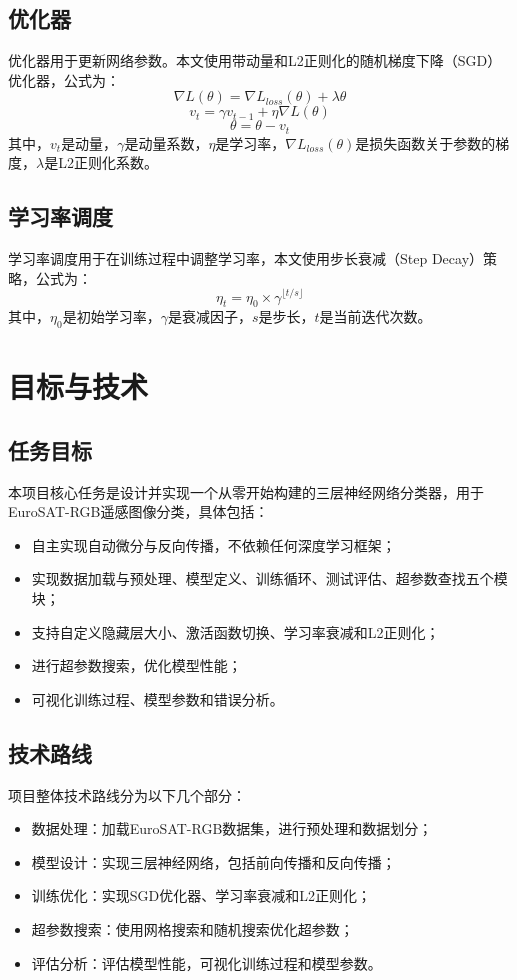 \documentclass[UTF8]{article}
\begin{document}
\subsection{优化器}

优化器用于更新网络参数。本文使用带动量和L2正则化的随机梯度下降（SGD）优化器，公式为：
$$\nabla L(\theta) = \nabla L_{loss}(\theta) + \lambda \theta$$
$$v_t = \gamma v_{t-1} + \eta \nabla L(\theta)$$
$$\theta = \theta - v_t$$
其中，$v_t$是动量，$\gamma$是动量系数，$\eta$是学习率，$\nabla L_{loss}(\theta)$是损失函数关于参数的梯度，$\lambda$是L2正则化系数。

\subsection{学习率调度}

学习率调度用于在训练过程中调整学习率，本文使用步长衰减（Step Decay）策略，公式为：
$$\eta_t = \eta_0 \times \gamma^{\lfloor t / s \rfloor}$$
其中，$\eta_0$是初始学习率，$\gamma$是衰减因子，$s$是步长，$t$是当前迭代次数。

\section{目标与技术}

\subsection{任务目标}
本项目核心任务是设计并实现一个从零开始构建的三层神经网络分类器，用于EuroSAT-RGB遥感图像分类，具体包括：
\begin{itemize}[topsep=0pt, partopsep=0pt, itemsep=0pt, parsep=0pt]
    \item 自主实现自动微分与反向传播，不依赖任何深度学习框架；
    \item 实现数据加载与预处理、模型定义、训练循环、测试评估、超参数查找五个模块；
    \item 支持自定义隐藏层大小、激活函数切换、学习率衰减和L2正则化；
    \item 进行超参数搜索，优化模型性能；
    \item 可视化训练过程、模型参数和错误分析。
\end{itemize}

\subsection{技术路线}
项目整体技术路线分为以下几个部分：
\begin{itemize}[topsep=0pt, partopsep=0pt, itemsep=0pt, parsep=0pt]
    \item 数据处理：加载EuroSAT-RGB数据集，进行预处理和数据划分；
    \item 模型设计：实现三层神经网络，包括前向传播和反向传播；
    \item 训练优化：实现SGD优化器、学习率衰减和L2正则化；
    \item 超参数搜索：使用网格搜索和随机搜索优化超参数；
    \item 评估分析：评估模型性能，可视化训练过程和模型参数。
\end{itemize}
\end{document}

